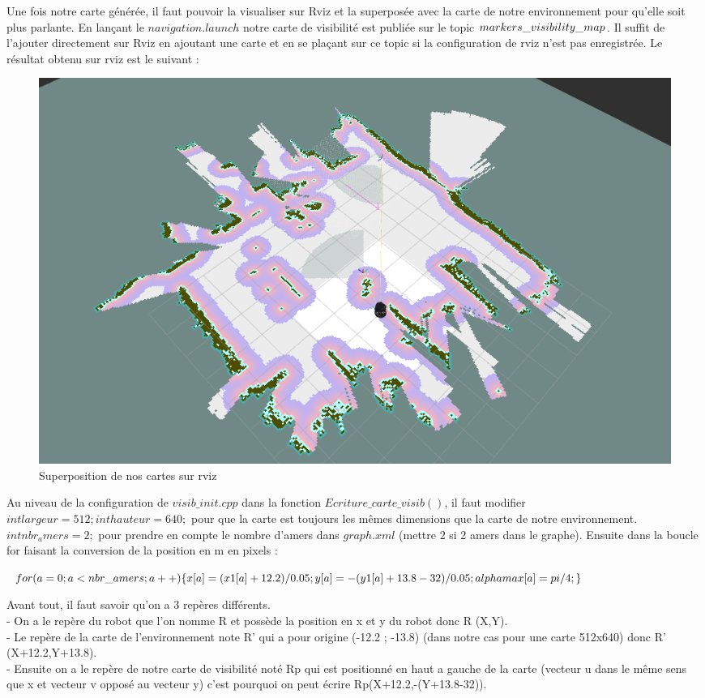 \documentclass[10pt,a4paper]{article}
\begin{document}
Une fois notre carte générée, il faut pouvoir la visualiser sur Rviz et la superposée avec la carte de notre environnement pour qu'elle soit plus parlante. En lançant le $navigation.launch$ notre carte de visibilité est publiée sur le topic $\/markers\_visibility\_map$. Il suffit de l'ajouter directement sur Rviz en ajoutant une carte et en se plaçant sur ce topic si la configuration de rviz n'est pas enregistrée. Le résultat obtenu sur rviz est le suivant :

\begin{figure}[!h]
\center
\includegraphics[scale=0.4]{figures/visib_rviz.png} 
\caption{Superposition de nos cartes sur rviz}	
\end{figure}

Au niveau de la configuration de $visib\_init.cpp$ dans la fonction $Ecriture\_carte\_visib()$, il faut modifier $int largeur=512;	 int hauteur=640;$ pour que la carte est toujours les mêmes dimensions que la carte de notre environnement. $int nbr_amers=2;$ pour prendre en compte le nombre d'amers dans $graph.xml$ (mettre 2 si 2 amers dans le graphe). Ensuite dans la boucle for faisant la conversion de la position en m en pixels :

$\\
for(a=0;a<nbr\_amers;a++)\\
	\{	\\
		x[a]=(x1[a]+12.2)/0.05;\\
		y[a]=-(y1[a]+13.8-32)/0.05;\\
		alphamax[a]=pi/4;\\
	\}\\
	$

Avant tout, il faut savoir qu'on a 3 repères différents.\\ 
- On a le repère du robot que l'on nomme R et possède la position en x et y du robot donc R (X,Y).\\
- Le repère de la carte de l'environnement note R' qui a pour origine (-12.2 ; -13.8) (dans notre cas pour une carte 512x640) donc R' (X+12.2,Y+13.8).\\
- Ensuite on a le repère de notre carte de visibilité noté Rp qui est positionné en haut a gauche de la carte (vecteur u dans le même sens que x et vecteur v opposé au vecteur y) c'est pourquoi on peut écrire Rp(X+12.2,-(Y+13.8-32)).\\
\end{document}
